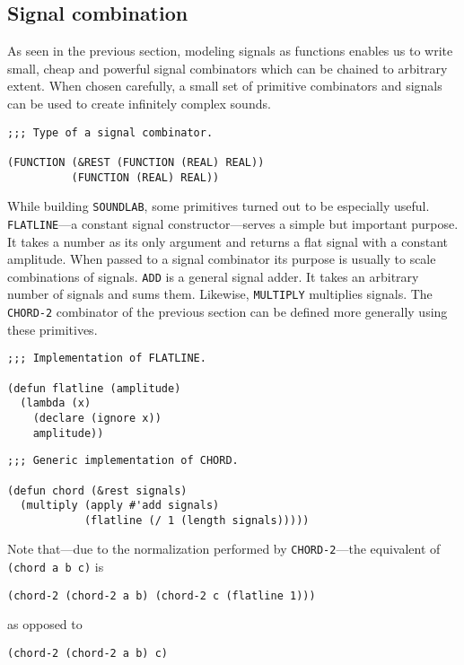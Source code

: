 \subsection{Signal combination}

As seen in the previous section, modeling signals as functions
enables us to write small, cheap and powerful signal combinators which
can be chained to arbitrary extent. When chosen carefully, a small set of
primitive combinators and signals can be used to create infinitely
complex sounds.

\begin{verbatim}
;;; Type of a signal combinator.

(FUNCTION (&REST (FUNCTION (REAL) REAL))
          (FUNCTION (REAL) REAL))
\end{verbatim}

While building \texttt{SOUNDLAB}, some primitives turned out to be
especially useful. \texttt{FLATLINE}---a constant signal
constructor---serves a simple but important purpose. It takes a number as
its only argument and returns a flat signal with a constant
amplitude. When passed to a signal combinator its purpose is usually to
scale combinations of signals. \texttt{ADD} is a general signal adder. It
takes an arbitrary number of signals and sums them. Likewise,
\texttt{MULTIPLY} multiplies signals. The \texttt{CHORD-2} combinator of
the previous section can be defined more generally using these primitives.  

\begin{verbatim}
;;; Implementation of FLATLINE.

(defun flatline (amplitude)
  (lambda (x)
    (declare (ignore x))
    amplitude))
\end{verbatim}

\begin{verbatim}
;;; Generic implementation of CHORD.

(defun chord (&rest signals)
  (multiply (apply #'add signals)
            (flatline (/ 1 (length signals)))))
\end{verbatim}

Note that---due to the normalization performed by \texttt{CHORD-2}---the
equivalent of \texttt{(chord a b c)} is

\begin{verbatim}
(chord-2 (chord-2 a b) (chord-2 c (flatline 1)))
\end{verbatim}

as opposed to 

\begin{verbatim}
(chord-2 (chord-2 a b) c)
\end{verbatim}

